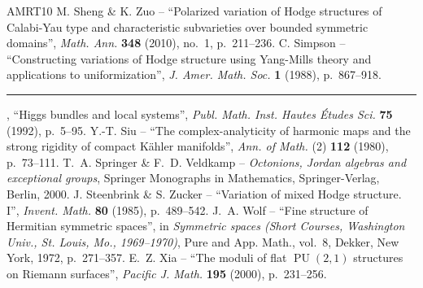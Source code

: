 \documentclass[10pt]{article}
\theoremstyle{definition}
\numberwithin{equation}{section}
\begin{document}
{\begin{thebibliography}{AMRT10}
 M. Sheng \& K. Zuo -- ``Polarized variation of Hodge structures of Calabi-Yau type and characteristic subvarieties over bounded symmetric domains'', \emph{Math. Ann.} \textbf{348} (2010), no.~1, p.~211--236.
 C. Simpson -- ``Constructing variations of Hodge structure using Yang-Mills theory and applications to uniformization'', \emph{J. Amer. Math. Soc.} \textbf{1} (1988), p.~867--918.
 \rule{1.2em}{.1pt}, ``Higgs bundles and local systems'', \emph{Publ. Math. Inst. Hautes Études Sci.} \textbf{75} (1992), p.~5--95.
 Y.-T. Siu -- ``The complex-analyticity of harmonic maps and the strong rigidity of compact Kähler manifolds'', \emph{Ann. of Math.} (2) \textbf{112} (1980), p.~73--111.
 T.~A. Springer \& F.~D. Veldkamp -- \emph{Octonions, Jordan algebras and exceptional groups}, Springer Monographs in Mathematics, Springer-Verlag, Berlin, 2000.
 J. Steenbrink \& S. Zucker -- ``Variation of mixed Hodge structure. I'', \emph{Invent. Math.} \textbf{80} (1985), p.~489--542.
 J.~A. Wolf -- ``Fine structure of Hermitian symmetric spaces'', in \emph{Symmetric spaces (Short Courses, Washington Univ., St. Louis, Mo., 1969--1970)}, Pure and App. Math., vol.~8, Dekker, New York, 1972, p.~271--357.
 E.~Z. Xia -- ``The moduli of flat $\operatorname{PU}(2,1)$ structures on Riemann surfaces'', \emph{Pacific J. Math.} \textbf{195} (2000), p.~231--256.
\end{thebibliography}
}
\end{document}
